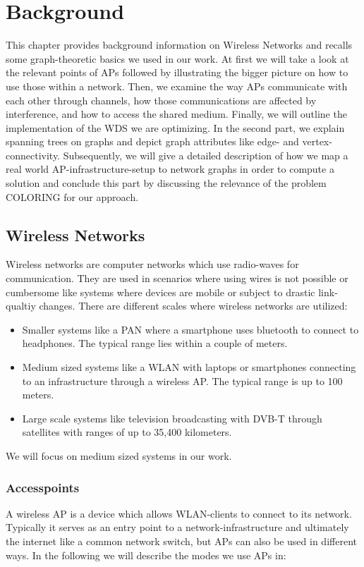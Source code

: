 \chapter{Background}
This chapter provides background information on Wireless Networks and recalls some graph-theoretic basics we used in our work.
At first we will take a look at the relevant points of APs followed by illustrating the bigger picture on how to use those
within a network. Then, we examine the way APs communicate with each other through channels, how those communications are affected by interference, and
how to access the shared medium. Finally, we will outline the implementation of the \ac{WDS} we are optimizing.
In the second part, we explain spanning trees on graphs and depict graph attributes like edge- and vertex-connectivity.
Subsequently, we will give a detailed description of how we map a real world \ac{AP}-infrastructure-setup to network graphs in order 
to compute a solution and conclude this part by discussing the relevance of the problem COLORING for our approach.

\section{Wireless Networks}
  Wireless networks are computer networks which use radio-waves for communication.
  They are used in scenarios where using wires is not possible or cumbersome like systems where devices are mobile or subject to drastic link-qualtiy changes.
  There are different scales where wireless networks are utilized:
  \begin{itemize}
    \item Smaller systems like a \ac{PAN} where a smartphone uses bluetooth to connect to headphones. The typical range lies within a couple of meters.
    \item Medium sized systems like a \ac{WLAN} with laptops or smartphones connecting to an infrastructure through a wireless \ac{AP}.
      The typical range is up to 100 meters.
    \item Large scale systems like television broadcasting with \ac{DVB-T} through satellites with ranges of up to 35,400 kilometers.
  \end{itemize}
  
  We will focus on medium sized systems in our work.

  \subsection{Accesspoints}
    A wireless \ac{AP} is a device which allows \ac{WLAN}-clients to connect to its network.
    Typically it serves as an entry point to a network-infrastructure and ultimately the internet like a common network switch, 
    but APs can also be used in different ways. In the following we will describe the modes we use APs in:
    
